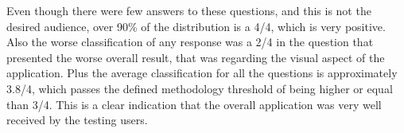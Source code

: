 Even though there were few answers to these questions, and this is not the desired audience, over 90\% of the distribution is a 4/4, which is very positive.
Also the worse classification of any response was a 2/4 in the question that presented the worse overall result, that was regarding the visual aspect of the application.
Plus the average classification for all the questions is approximately 3.8/4, which passes the defined methodology threshold of being higher or equal than 3/4.
This is a clear indication that the overall application was very well received by the testing users.

